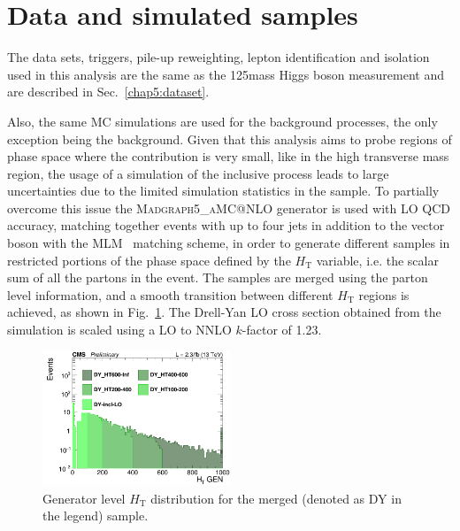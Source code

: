 \section{Data and simulated samples}\label{chap6:datatsets}

The data sets, triggers, pile-up reweighting, lepton identification and isolation used in this analysis are the same as the 125\GeV mass Higgs boson measurement and are described in Sec.~\ref{chap5:dataset}.

Also, the same MC simulations are used for the background processes, the only exception being the \dyll background. Given that this analysis aims to probe regions of phase space where the \dyll contribution is very small, like in the high transverse mass region, the usage of a simulation of the inclusive \dyll process leads to large uncertainties due to the limited simulation statistics in the sample. To partially overcome this issue the \textsc{Madgraph5\_aMC@NLO} generator is used with LO QCD accuracy, matching together events with up to four jets in addition to the vector boson with the MLM~\cite{Alwall:2007fs} matching scheme, in order to generate different \dyll samples in restricted portions of the phase space defined by the $H_\mathrm{T}$ variable, i.e. the scalar sum of all the partons \pt in the event. 
The samples are merged using the parton level information, and a smooth transition between different $H_\mathrm{T}$ regions is achieved, as shown in Fig.~\ref{fig:DY_HT}. The Drell-Yan LO cross section obtained from the simulation is scaled using a LO to NNLO $k$-factor of 1.23.

\begin{figure}[htbp]
\centering
\includegraphics[width=0.5\textwidth]{images/13TeV/log_c_incl_HTGen.png}
\caption{
    Generator level $H_\mathrm{T}$ distribution for the merged \dyll (denoted as DY in the legend) sample.}
    \label{fig:DY_HT}
\end{figure}

